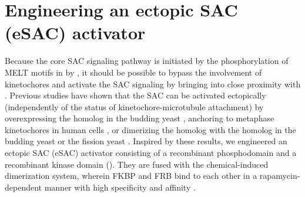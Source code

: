 \section{Engineering an ectopic SAC (eSAC) activator}

Because the core SAC signaling pathway is initiated by the phosphorylation of MELT motifs in  by  \cite{MPS1-KNL1_London2012, MPS1-KNL1_Shepperd2012, MPS1-KNL1_Yamagishi2012}, it should be possible to bypass the involvement of kinetochores and activate the SAC signaling by bringing  into close proximity with . Previous studies have shown that the SAC can be activated ectopically (independently of the status of kinetochore-microtubule attachment) by overexpressing the  homolog in the budding yeast \cite{Mps1pOverexpressionActivatesSAC}, anchoring  to metaphase kinetochores in human cells \cite{HeLa-A12_Ballister2014}, or dimerizing the  homolog with the  homolog in the budding yeast \cite{BuddingYeasteSAC} or the fission yeast \cite{FissionYeasteSAC}. Inspired by these results, we engineered an ectopic SAC (eSAC) activator consisting of a recombinant  phosphodomain and a recombinant  kinase domain (). They are fused with the chemical-induced dimerization system, wherein FKBP and FRB bind to each other in a rapamycin-dependent manner with high specificity and affinity \cite{FKBP-Rapamycin-FRB}.

